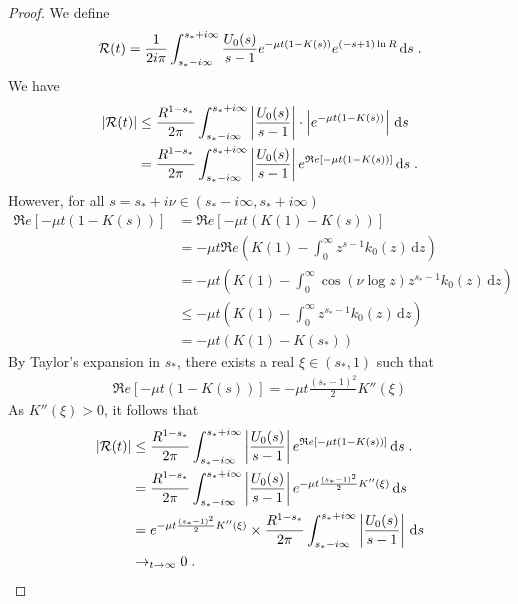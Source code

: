 \documentclass[11pt]{amsart}
\renewcommand{\Re}{\mathfrak{R}e}
\newcommand{\diff}{\,\mathrm{d}}
\begin{document}
\begin{proof}
            We define
            \begin{align*}
                \Rcal(t) = \frac{1}{2i\pi} \int_{s_*-i\infty}^{s_*+i\infty} \frac{U_0(s)}{s-1} e^{-\mu t(1 - K(s))} e^{(-s+1)\ln R} \diff s
                \eqfinp
            \end{align*}
            We have 
            \begin{align*}
                |\Rcal(t)| 
                &\leq \frac{R^{1-s_*}}{2\pi} \int_{s_*-i\infty}^{s_*+i\infty} \left|\frac{U_0(s) }{s-1}\right| \cdot \left|e^{-\mu t(1 - K(s))}\right| \diff s \\
                &= \frac{R^{1-s_*}}{2\pi} \int_{s_*-i\infty}^{s_*+i\infty} \left|\frac{U_0(s) }{s-1}\right| e^{\Re[-\mu t(1 - K(s))]} \diff s
                \eqfinp
            \end{align*}
            However, for all $s = s_* + i\nu \in (s_*-i \infty, s_* + i \infty)$
            \begin{align*}
                \Re[-\mu t(1 - K(s))] 
                &= \Re[-\mu t(K(1) - K(s))] \\
                &= -\mu t \Re\left( K(1) - \int_0^\infty z^{s-1}k_0(z)\diff z  \right) \\
                &=  -\mu t\left( K(1) - \int_0^\infty \cos(\nu \log z) z^{s_*-1}k_0(z)\diff z  \right) \\
                &\leq -\mu t \left( K(1) - \int_0^\infty z^{s_*-1}k_0(z)\diff z  \right) \\
                &= -\mu t \left( K(1) - K(s_*)  \right)
            \end{align*}
            By Taylor's expansion in $s_*$, there exists a real $\xi \in (s_*, 1)$ such that 
            \begin{align*}
                \Re[-\mu t(1 - K(s))] = - \mu t \frac{(s_*-1)^2}{2}  K''(\xi) 
            \end{align*}
            As $ K''(\xi) > 0$, it follows that 
            \begin{align*}
                |\Rcal(t)| 
                &\leq \frac{R^{1-s_*}}{2\pi} \int_{s_*-i\infty}^{s_*+i\infty} \left|\frac{U_0(s) }{s-1}\right| e^{\Re[-\mu t(1 - K(s))]} \diff s
                \eqfinp \\
                &= \frac{R^{1-s_*}}{2\pi} \int_{s_*-i\infty}^{s_*+i\infty} \left|\frac{U_0(s) }{s-1}\right| e^{- \mu t \frac{(s_*-1)^2}{2}  K''(\xi) } \diff s \\
                &= e^{- \mu t \frac{(s_*-1)^2}{2}  K''(\xi)} \times \frac{R^{1-s_*}}{2\pi} \int_{s_*-i\infty}^{s_*+i\infty} \left|\frac{U_0(s) }{s-1}\right| \diff s \\
                &\to_{t \to \infty} 0
                \eqfinp
            \end{align*}
            

\end{proof}
\end{document}
